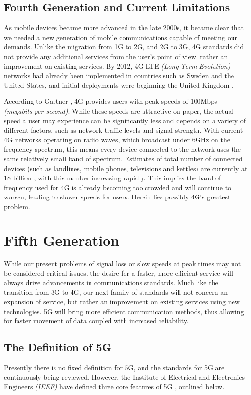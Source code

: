 \documentclass[journal]{IEEEtran}
\begin{document}
\subsection{Fourth Generation and Current Limitations} \label{subsec:4g}
As mobile devices became more advanced in the late 2000s, it became clear that we needed a new generation of mobile communications capable of meeting our demands. Unlike the migration from 1G to 2G, and 2G to 3G, 4G standards did not provide any additional services from the user's point of view, rather an improvement on existing services. By 2012, 4G LTE \textit{(Long Term Evolution)} networks had already been implemented in countries such as Sweden and the United States, and initial deployments were beginning the United Kingdom \cite{bbc4g}. 

According to Gartner \cite{gartner4g}, 4G provides users with peak speeds of 100Mbps \textit{(megabits-per-second)}. While these speeds are attractive on paper, the actual speed a user may experience can be significantly less and depends on a variety of different factors, such as network traffic levels and signal strength. With current 4G networks operating on radio waves, which broadcast under 6GHz on the frequency spectrum, this means every device connected to the network uses the same relatively small band of spectrum. Estimates of total number of connected devices (such as landlines, mobile phones, televisions and kettles) are currently at 18 billion \cite{ericssondev}, with this number increasing rapidly. This implies the band of frequency used for 4G is already becoming too crowded and will continue to worsen, leading to slower speeds for users. Herein lies possibly 4G's greatest problem.

\section{Fifth Generation}
While our present problems of signal loss or slow speeds at peak times may not be considered critical issues, the desire for a faster, more efficient service will always drive advancements in communications standards. Much like the transition from 3G to 4G, our next family of standards will not concern an expansion of service, but rather an improvement on existing services using new technologies. 5G will bring more efficient communication methods, thus allowing for faster movement of data coupled with increased reliability.

\subsection{The Definition of 5G} \label{subsec:def5g}
Presently there is no fixed definition for 5G, and the standards for 5G are continuously being reviewed. However, the Institute of Electrical and Electronics Engineers \textit{(IEEE)} have defined three core features of 5G \cite{ieee5g}, outlined below. 
\end{document}
